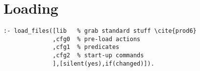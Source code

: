 \documentclass[twocolumn,global]{svjour}
\begin{document}
\section{Loading}
\begin{Verbatim}
:- load_files([lib   % grab standard stuff \cite{prod6}
              ,cfg0  % pre-load actions
              ,cfg1  % predicates
              ,cfg2  % start-up commands
              ],[silent(yes),if(changed)]).
\end{Verbatim}




\theend
\end{document}

